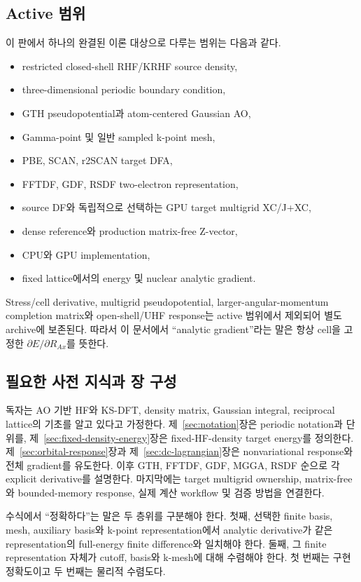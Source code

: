 \subsection{Active 범위}

이 판에서 하나의 완결된 이론 대상으로 다루는 범위는 다음과 같다.

\begin{itemize}
  \item restricted closed-shell RHF/KRHF source density,
  \item three-dimensional periodic boundary condition,
  \item GTH pseudopotential과 atom-centered Gaussian AO,
  \item Gamma-point 및 일반 sampled k-point mesh,
  \item PBE, SCAN, r2SCAN target DFA,
  \item FFTDF, GDF, RSDF two-electron representation,
  \item source DF와 독립적으로 선택하는 GPU target multigrid XC/J+XC,
  \item dense reference와 production matrix-free Z-vector,
  \item CPU와 GPU implementation,
  \item fixed lattice에서의 energy 및 nuclear analytic gradient.
\end{itemize}

Stress/cell derivative, multigrid pseudopotential, larger-angular-momentum completion
matrix와 open-shell/UHF response는 active 범위에서 제외되어 별도 archive에 보존된다.
따라서 이 문서에서 ``analytic gradient''라는 말은 항상 cell을 고정한
$\partial E/\partial R_{Ax}$를 뜻한다.

\subsection{필요한 사전 지식과 장 구성}

독자는 AO 기반 HF와 KS-DFT, density matrix, Gaussian integral, reciprocal lattice의
기초를 알고 있다고 가정한다. 제~\ref{sec:notation}장은 periodic notation과 단위를,
제~\ref{sec:fixed-density-energy}장은 fixed-HF-density target energy를 정의한다.
제~\ref{sec:orbital-response}장과 제~\ref{sec:dc-lagrangian}장은 nonvariational
response와 전체 gradient를 유도한다. 이후 GTH, FFTDF, GDF, MGGA, RSDF 순으로 각
explicit derivative를 설명한다. 마지막에는 target multigrid ownership, matrix-free와
bounded-memory response, 실제 계산 workflow 및 검증 방법을 연결한다.

수식에서 ``정확하다''는 말은 두 층위를 구분해야 한다. 첫째, 선택한 finite basis,
mesh, auxiliary basis와 k-point representation에서 analytic derivative가 같은
representation의 full-energy finite difference와 일치해야 한다. 둘째, 그 finite
representation 자체가 cutoff, basis와 k-mesh에 대해 수렴해야 한다. 첫 번째는 구현
정확도이고 두 번째는 물리적 수렴도다.

